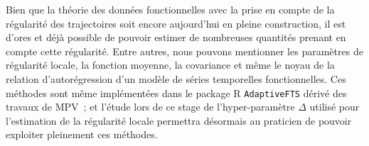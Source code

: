 \bigskip

Bien que la théorie des données fonctionnelles avec la prise en compte de la régularité des trajectoires soit encore aujourd'hui en pleine construction, il est d'ores et déjà possible de pouvoir estimer de nombreuses quantités prenant en compte cette régularité. Entre autres, nous pouvons mentionner les paramètres de régularité locale, la fonction moyenne, la covariance et même le noyau de la relation d'autorégression d'un modèle de séries temporelles fonctionnelles. Ces méthodes sont même implémentées dans le package R \texttt{AdaptiveFTS} dérivé des travaux de MPV~\cite{maissoro-SmoothnessFTSweakDep}; et l'étude lors de ce stage de l'hyper-paramètre $\Delta$ utilisé pour l'estimation de la régularité locale permettra désormais au praticien de pouvoir exploiter pleinement ces méthodes.
